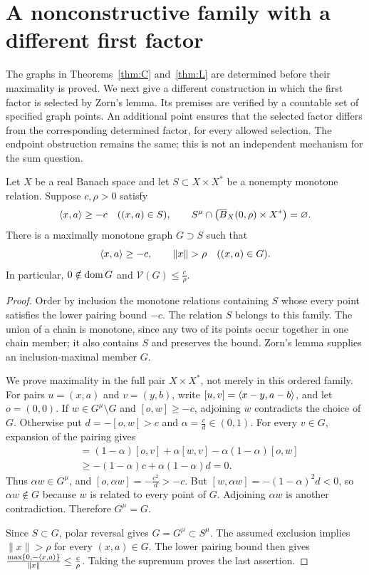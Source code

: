 \section{A nonconstructive family with a different first factor}
\label{sec:nonconstructive}
The graphs in Theorems~\ref{thm:C} and~\ref{thm:L} are determined before
their maximality is proved. We next give a different construction in which
the first factor is selected by Zorn's lemma. Its premises are verified
by a countable set of specified graph points. An additional point ensures that the
selected factor differs from the corresponding determined factor, for
every allowed selection. The endpoint obstruction remains the same;
this is not an independent mechanism for the sum question.

\begin{lemma}
\label{lem:capped-extension}
Let $X$ be a real Banach space and let $S\subset X\times X^*$ be a
nonempty monotone relation. Suppose $c,\rho>0$ satisfy
\[
\langle x,a\rangle\ge-c\quad((x,a)\in S),\qquad
S^\mu\cap\bigl(\overline B_X(0,\rho)\times X^*\bigr)=\varnothing.
\]
There is a maximally monotone graph $G\supset S$ such that
\[
\pair{x}{a}\ge-c,\qquad \|x\|>\rho\quad((x,a)\in G).
\]
In particular, $0\notin\operatorname{dom} G$ and $\mathcal V(G)\le \frac{c}{\rho}$.
\end{lemma}
\begin{proof}
Order by inclusion the monotone relations containing $S$ whose every point
satisfies the lower pairing bound $-c$. The relation $S$ belongs to this
family. The union of a chain is monotone, since any two of its points occur
together in one chain member; it also contains $S$ and preserves the
bound. Zorn's lemma supplies an inclusion-maximal member $G$.

We prove maximality in the full pair $X\times X^*$, not merely in this
ordered family. For pairs $u=(x,a)$ and $v=(y,b)$, write
$[u,v]=\langle x-y,a-b\rangle$, and let $o=(0,0)$. If
$w\in G^\mu\setminus G$ and $[o,w]\ge-c$, adjoining $w$ contradicts
the choice of $G$. Otherwise put $d=-[o,w]>c$ and $\alpha=\frac{c}{d}\in(0,1)$.
For every $v\in G$, expansion of the pairing gives
\begin{align*}
[\alpha w,v]
&=(1-\alpha)[o,v]+\alpha[w,v]-\alpha(1-\alpha)[o,w]\\
&\ge-(1-\alpha)c+\alpha(1-\alpha)d=0.
\end{align*}
Thus $\alpha w\in G^\mu$, and
$[o,\alpha w]=-\frac{c^2}{d}>-c$. But
$[w,\alpha w]=-(1-\alpha)^2d<0$, so $\alpha w\notin G$ because
$w$ is related to every point of $G$. Adjoining $\alpha w$ is another
contradiction. Therefore $G^\mu=G$.

Since $S\subset G$, polar reversal gives $G=G^\mu\subset S^\mu$.
The assumed exclusion implies $\|x\|>\rho$ for every $(x,a)\in G$. The lower
pairing bound then gives
$\frac{\max\{0,-\langle x,a\rangle\}}{\|x\|}\le \frac{c}{\rho}$. Taking the supremum
proves the last assertion.
\end{proof}

